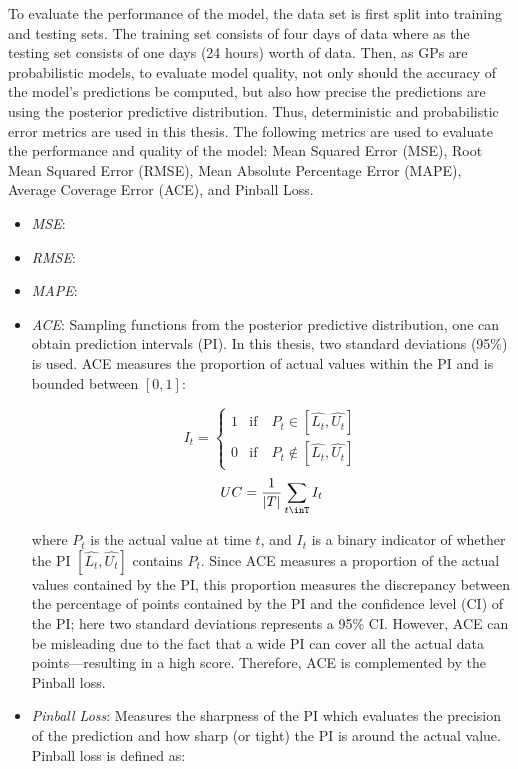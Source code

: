 To evaluate the performance of the model, the data set is first split into training and testing sets. The training set consists of four days of data where as the testing set consists of one days (24 hours) worth of data. Then, as GPs are probabilistic models, to evaluate model quality, not only should the accuracy of the model's predictions be computed, but also how precise the predictions are using the posterior predictive distribution. Thus, deterministic and probabilistic error metrics are used in this thesis. The following metrics are used to evaluate the performance and quality of the model: Mean Squared Error (MSE), Root Mean Squared Error (RMSE), Mean Absolute Percentage Error (MAPE), Average Coverage Error (ACE), and Pinball Loss.

\begin{itemize}
    \item \textit{MSE}: 
    \item \textit{RMSE}:
    \item \textit{MAPE}:
    \item \textit{ACE}: Sampling functions from the posterior predictive distribution, one can obtain prediction intervals (PI). In this thesis, two standard deviations (95\%) is used. ACE measures the proportion of actual values within the PI and is bounded between $[0, 1]$:
    
    $$ I_t = 
    \begin{cases}
      1 & \text{if} \quad P_t \in [\hat{L_t}, \hat{U_t}] \\
      0 & \text{if} \quad P_t \notin [\hat{L_t}, \hat{U_t}]
    \end{cases}
    $$
    $$UC = \frac{1}{|T|}\sum_{t\inT}I_t$$
    
    where $P_t$ is the actual value at time $t$, and $I_t$ is a binary indicator of whether the PI $ [\hat{L_t}, \hat{U_t}]$ contains $P_t$. Since ACE measures a proportion of the actual values contained by the PI, this proportion measures the discrepancy between the percentage of points contained by the PI and the confidence level (CI) of the PI; here two standard deviations represents a 95\% CI. However, ACE can be misleading due to the fact that a wide PI can cover all the actual data points—resulting in a high score. Therefore, ACE is complemented by the Pinball loss.
    
    \item \textit{Pinball Loss}: Measures the sharpness of the PI which evaluates the precision of the prediction and how sharp (or tight) the PI is around the actual value. Pinball loss is defined as:
    

\end{itemize}
